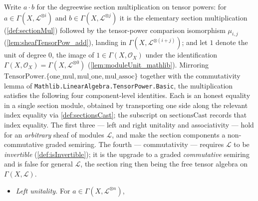 \begin{lemma}
  \label{lem:sectionMul_coherent}
  Write \(a \cdot b\) for the degreewise section multiplication on tensor powers:
  for \(a \in \Gamma(X, \mathcal{L}^{\otimes i})\) and
  \(b \in \Gamma(X, \mathcal{L}^{\otimes j})\) it is the elementary section
  multiplication (\cref{def:sectionMul}) followed by the tensor-power comparison
  isomorphism \(\mu_{i,j}\) (\cref{lem:sheafTensorPow_add}), landing in
  \(\Gamma(X, \mathcal{L}^{\otimes (i+j)})\); and let \(1\) denote the unit of
  degree \(0\), the image of \(1 \in \Gamma(X,\mathcal{O}_X)\) under the
  identification \(\Gamma(X,\mathcal{O}_X) = \Gamma(X, \mathcal{L}^{\otimes 0})\)
  (\cref{lem:moduleUnit_mathlib}). Mirroring
  \(\mathrm{TensorPower.\{one\_mul, mul\_one, mul\_assoc\}}\) together with the
  commutativity lemma of \texttt{Mathlib.LinearAlgebra.TensorPower.Basic}, the
  multiplication satisfies the following four component-level identities. Each is
  an honest equality in a single section module, obtained by transporting one side
  along the relevant index equality via \cref{def:sectionsCast}; the subscript on
  \(\mathrm{sectionsCast}\) records that index equality. The first three ---
  left and right unitality and associativity --- hold for an \emph{arbitrary}
  sheaf of modules \(\mathcal{L}\), and make the section components a
  non-commutative graded semiring. The fourth --- commutativity --- requires
  \(\mathcal{L}\) to be \emph{invertible} (\cref{def:isInvertible}); it is the
  upgrade to a graded \emph{commutative} semiring and is false for general
  \(\mathcal{L}\), the section ring then being the free tensor algebra on
  \(\Gamma(X,\mathcal{L})\).
  \begin{itemize}
    \item \emph{Left unitality.} For \(a \in \Gamma(X, \mathcal{L}^{\otimes n})\),

\end{itemize}
\end{lemma}
